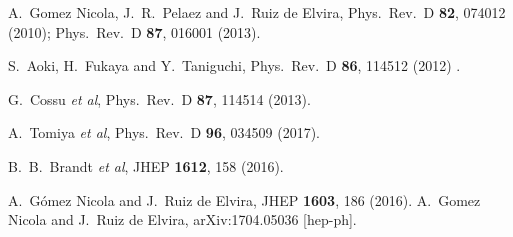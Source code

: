 \documentclass{PoS}
\begin{document}
\begin{thebibliography}{99}
 A.~Gomez Nicola, J.~R.~Pelaez and J.~Ruiz de Elvira,
  Phys.\ Rev.\ D {\bf 82}, 074012 (2010);
  Phys.\ Rev.\ D {\bf 87}, 016001 (2013).
 
  S.~Aoki, H.~Fukaya and Y.~Taniguchi,
  Phys.\ Rev.\ D {\bf 86}, 114512 (2012) .

  G.~Cossu {\em et al}, 
  Phys.\ Rev.\ D {\bf 87}, 114514 (2013).

  A.~Tomiya {\em et al}, 
  Phys.\ Rev.\ D {\bf 96}, 034509 (2017).

  B.~B.~Brandt {\em et al}, 
  JHEP {\bf 1612}, 158 (2016).

  A.~G\'omez Nicola and J.~Ruiz de Elvira,
  JHEP {\bf 1603}, 186 (2016).
  A.~Gomez Nicola and J.~Ruiz de Elvira,
  arXiv:1704.05036 [hep-ph].
 

\end{thebibliography}
\end{document}
